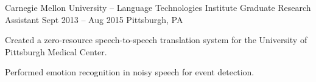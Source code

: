 \begin{cventries}
  \cventry
   {Carnegie Mellon University -- Language Technologies Institute} %
    {Graduate Research Assistant} %
    {Sept 2013 – Aug 2015} %
    {Pittsburgh, PA} %
    {
      \begin{cvitems} %
        \item {Created a zero-resource speech-to-speech translation system for the University of Pittsburgh Medical Center.}
        \item {Performed emotion recognition in noisy speech for event detection.}
      \end{cvitems}
    }


\end{cventries}
